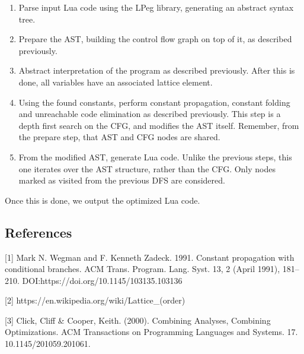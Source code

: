 \documentclass[
]{article}
\begin{document}
\begin{enumerate}
\def\labelenumi{\arabic{enumi}.}
\item
  Parse input Lua code using the LPeg library, generating an abstract
  syntax tree.
\item
  Prepare the AST, building the control flow graph on top of it, as
  described previously.
\item
  Abstract interpretation of the program as described previously. After
  this is done, all variables have an associated lattice element.
\item
  Using the found constants, perform constant propagation, constant
  folding and unreachable code elimination as described previously. This
  step is a depth first search on the CFG, and modifies the AST itself.
  Remember, from the prepare step, that AST and CFG nodes are shared.
\item
  From the modified AST, generate Lua code. Unlike the previous steps,
  this one iterates over the AST structure, rather than the CFG. Only
  nodes marked as visited from the previous DFS are considered.
\end{enumerate}

Once this is done, we output the optimized Lua code.

\hypertarget{references}{%
\subsection{References}\label{references}}

{[}1{]} Mark N. Wegman and F. Kenneth Zadeck. 1991. Constant propagation
with conditional branches. ACM Trans. Program. Lang. Syst. 13, 2 (April
1991), 181--210. DOI:https://doi.org/10.1145/103135.103136

{[}2{]} https://en.wikipedia.org/wiki/Lattice\_(order)

{[}3{]} Click, Cliff \& Cooper, Keith. (2000). Combining Analyses,
Combining Optimizations. ACM Transactions on Programming Languages and
Systems. 17. 10.1145/201059.201061.
\end{document}
